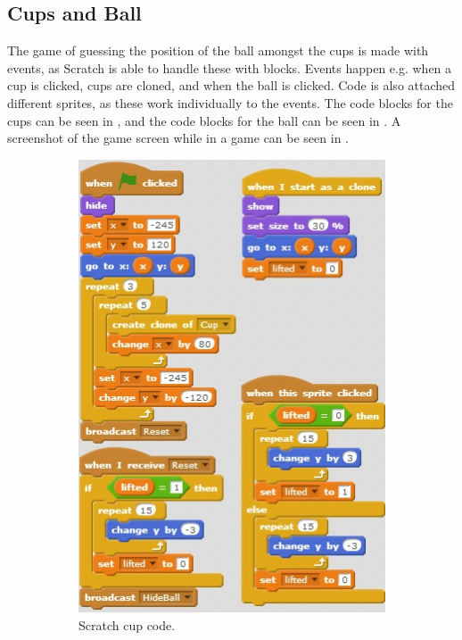 \subsection{Cups and Ball}
The game of guessing the position of the ball amongst the cups is made with events, as Scratch is able to handle these with blocks. Events happen e.g. when a cup is clicked, cups are cloned, and when the ball is clicked. Code is also attached different sprites, as these work individually to the events. The code blocks for the cups can be seen in , and the code blocks for the ball can be seen in . A screenshot of the game screen while in a game can be seen in .

\begin{figure}[h]
  \centering
    \begin{subfigure}[b]{0.45\textwidth}
    \begin{center}
      \includegraphics[scale=0.7]{./pics/scratch_ball_code1}
      \caption{Scratch cup code.}
      \label{fig:scratch_ball_code1}
    \end{center}
    \end{subfigure}
    ~
    \begin{subfigure}[b]{0.45\textwidth}
    \begin{center}

\end{center}
\end{subfigure}
\end{figure}
